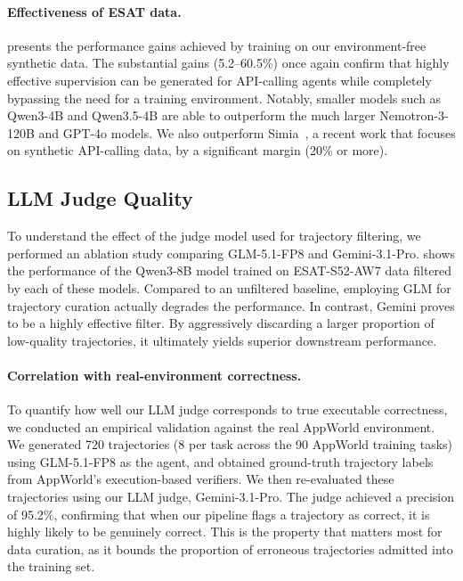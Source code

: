 \paragraph{Effectiveness of \textsc{ESAT} data.}  presents the performance gains achieved by training on our environment-free synthetic data. The substantial gains (5.2--60.5\%) once again confirm that highly effective supervision can be generated for API-calling agents while completely bypassing the need for a training environment. Notably, smaller models such as Qwen3-4B and Qwen3.5-4B are able to outperform the much larger Nemotron-3-120B and GPT-4o models. We also outperform Simia~\citep{li2025simulating}, a recent work that focuses on synthetic API-calling data, by a significant margin (20\% or more).

\subsection{LLM Judge Quality}
To understand the effect of the judge model used for trajectory filtering, we performed an ablation study comparing GLM-5.1-FP8 and Gemini-3.1-Pro.  shows the performance of the Qwen3-8B model trained on ESAT-S52-AW7 data filtered by each of these models. Compared to an unfiltered baseline, employing GLM for trajectory curation actually degrades the performance. In contrast, Gemini proves to be a highly effective filter. By aggressively discarding a larger proportion of low-quality trajectories, it ultimately yields superior downstream performance.



\paragraph{Correlation with real-environment correctness.} To quantify how well our LLM judge corresponds to true executable correctness, we conducted an empirical validation against the real AppWorld environment. We generated 720 trajectories (8 per task across the 90 AppWorld training tasks) using GLM-5.1-FP8 as the agent, and obtained ground-truth trajectory labels from AppWorld's execution-based verifiers. We then re-evaluated these trajectories using our LLM judge, Gemini-3.1-Pro. The judge achieved a precision of 95.2\%, confirming that when our pipeline flags a trajectory as correct, it is highly likely to be genuinely correct. This is the property that matters most for data curation, as it bounds the proportion of erroneous trajectories admitted into the training set.

